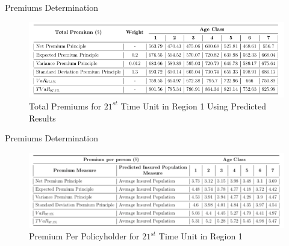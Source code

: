 \documentclass[10pt]{beamer} %
\begin{document}
\begin{frame}{Premiums Determination}
    \begin{figure}
        \centering
        \includegraphics[width=1\textwidth]{Premiums.png}
        \caption{Total Premiums for $21^{st}$ Time Unit in Region 1 Using Predicted Results}
        \label{fig:my_label}
    \end{figure}
\end{frame}

\begin{frame}{Premiums Determination}
    \begin{figure}
        \centering
        \includegraphics[width=1\textwidth]{PolicyHolder.png}
        \caption{Premium Per Policyholder for $21^{st}$ Time Unit in Region 1}
        \label{fig:my_label}
    \end{figure}
\end{frame}
\end{document}
